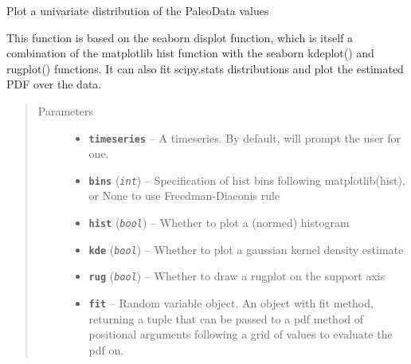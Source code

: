 \documentclass[letterpaper,10pt,english]{sphinxmanual}
\begin{document}
\begin{fulllineitems}
\begin{fulllineitems}
\begin{quote}
\begin{description}
\end{description}\end{quote}

\end{fulllineitems}


\begin{fulllineitems}
\label{TSPlots:pyleoclim.Plot.plot_hist}
Plot a univariate distribution of the PaleoData values

This function is based on the seaborn displot function, which is
itself a combination of the matplotlib hist function with the
seaborn kdeplot() and rugplot() functions. It can also fit
scipy.stats distributions and plot the estimated PDF over the data.
\begin{quote}\begin{description}
\item[{Parameters}] \leavevmode\begin{itemize}
\item {} 
\textbf{\texttt{timeseries}} -- A timeseries. By default, will prompt the user for one.

\item {} 
\textbf{\texttt{bins}} (\emph{\texttt{int}}) -- Specification of hist bins following matplotlib(hist),
or None to use Freedman-Diaconis rule

\item {} 
\textbf{\texttt{hist}} (\emph{\texttt{bool}}) -- Whether to plot a (normed) histogram

\item {} 
\textbf{\texttt{kde}} (\emph{\texttt{bool}}) -- Whether to plot a gaussian kernel density estimate

\item {} 
\textbf{\texttt{rug}} (\emph{\texttt{bool}}) -- Whether to draw a rugplot on the support axis

\item {} 
\textbf{\texttt{fit}} -- Random variable object. An object with fit method, returning
a tuple that can be passed to a pdf method of positional
arguments following a grid of values to evaluate the pdf on.


\end{itemize}
\end{description}
\end{quote}
\end{fulllineitems}
\end{fulllineitems}
\end{document}
